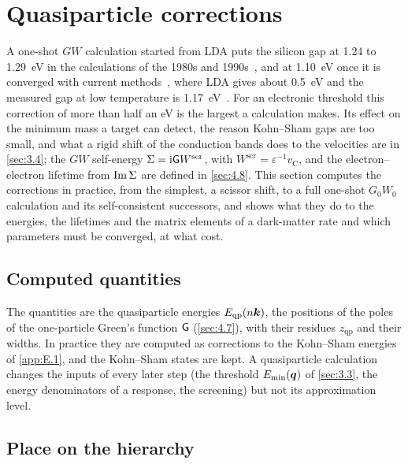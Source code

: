\section{Quasiparticle corrections}\label{app:E.3}

A one-shot $GW$ calculation started from LDA puts the silicon gap at 1.24 to \SI{1.29}{eV} in the calculations of the 1980s and 1990s~\cite[Table~I]{aryasetiawan1998gw}, and at \SI{1.10}{eV} once it is converged with current methods~\cite[Sect.~IV\,C]{klimes2014predictive}, where LDA gives about \SI{0.5}{eV} and the measured gap at low temperature is \SI{1.17}{eV}~\cite[Eq.~(11)]{ramanathan2020ionization}. For an electronic threshold this correction of more than half an eV is the largest a calculation makes. Its effect on the minimum mass a target can detect, the reason Kohn--Sham gaps are too small, and what a rigid shift of the conduction bands does to the velocities are in \cref{sec:3.4}; the $GW$ self-energy $\Sigma = \mathrm{i}\mathsf{G} W^{\mathrm{scr}}$, with $W^{\mathrm{scr}} = \varepsilon^{-1}v_{\mathrm{C}}$, and the electron--electron lifetime from $\operatorname{Im}\Sigma$ are defined in \cref{sec:4.8}. This section computes the corrections in practice, from the simplest, a scissor shift, to a full one-shot $G_0W_0$ calculation and its self-consistent successors, and shows what they do to the energies, the lifetimes and the matrix elements of a dark-matter rate and which parameters must be converged, at what cost.

\subsection{Computed quantities}

The quantities are the quasiparticle energies $E_{\mathrm{qp}}(n\bm{k})$, the positions of the poles of the one-particle Green's function $\mathsf{G}$ (\cref{sec:4.7}), with their residues $z_{\mathrm{qp}}$ and their widths. In practice they are computed as corrections to the Kohn--Sham energies of \cref{app:E.1}, and the Kohn--Sham states are kept. A quasiparticle calculation changes the inputs of every later step (the threshold $E_{\mathrm{min}}(\bm{q})$ of \cref{sec:3.3}, the energy denominators of a response, the screening) but not its approximation level.

\subsection{Place on the hierarchy}

